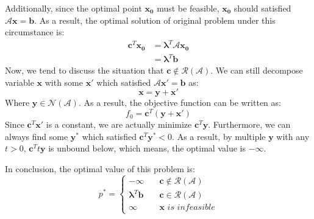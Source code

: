 \documentclass[10pt,a4paper]{article}
\begin{document}
Additionally, since the optimal point $\mathbf{x_{0}}$ must be feasible, $\mathbf{x_{0}}$ should satisfied $\mathcal{A} \mathbf{x} = \mathbf{b}$. As a result, the optimal solution of original problem under this circumstance is:
\begin{equation}
	\begin{aligned}
		\mathbf{c}^{T} \mathbf{x_{0}} &= \mathbf{\lambda}^{T} \mathcal{A} \mathbf{x_{0}} \\
		&=\mathbf{\lambda}^{T} \mathbf{b}
	\end{aligned}
\end{equation}
Now, we tend to discuss the situation that $\mathbf{c} \notin \mathcal{R}(\mathcal{A})$. We can still decompose variable $\mathbf{x}$  with some $\mathbf{x}'$ which satisfied $\mathcal{A} \mathbf{x}' = \mathbf{b}$ as:
\begin{equation*}
	\mathbf{x} = \mathbf{y} + \mathbf{x}'
\end{equation*}
Where $\mathbf{y} \in \mathcal{N}(\mathcal{A})$. As a result, the objective function can be written as:
\begin{equation*}
	f_{0} = \mathbf{c}^{T}(\mathbf{y} + \mathbf{x}')
\end{equation*}
Since $\mathbf{c}^{T} \mathbf{x}'$ is a constant, we are actually minimize $\mathbf{c}^{T} \mathbf{y}$. Furthermore, we can always find some $\mathbf{y}^{*}$ which satisfied $\mathbf{c}^{T} \mathbf{y}^{*} < 0$. As a result, by multiple $\mathbf{y}$  with any $t > 0$, $\mathbf{c}^{T} t\mathbf{y}$ is unbound below, which means, the optimal value is $-\infty$.

In conclusion, the optimal value of this problem is:
\begin{equation}
	p^{*} = 
	\begin{cases}
		-\infty \quad & \mathbf{c} \notin \mathcal{R}(\mathcal{A}) \\
		\mathbf{\lambda}^{T} \mathbf{b} \quad & \mathbf{c} \in \mathcal{R}(\mathcal{A}) \\
		\infty \quad & \mathbf{x}  \textit{ is infeasible} 
	\end{cases}
\end{equation}
\end{document}
